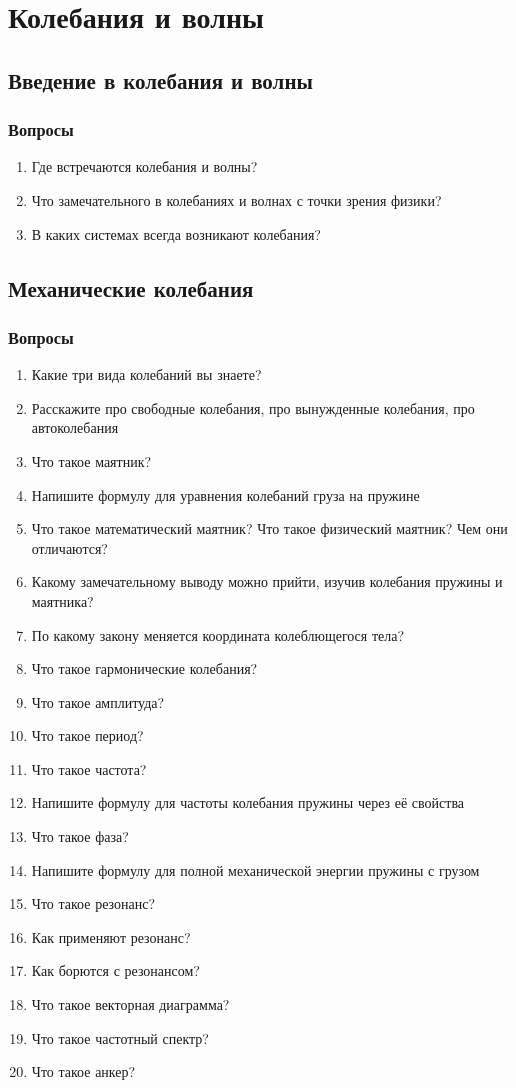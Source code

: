 \documentclass[12pt,a4paper]{report}
\begin{document}
\part{Колебания и волны}
\setcounter{chapter}{-1}

\chapter{Введение в колебания и волны}
\section{Вопросы}
\begin{enumerate}
\item Где встречаются колебания и волны?
\item Что замечательного в колебаниях и волнах с точки зрения физики?
\item В каких системах всегда возникают колебания?
\end{enumerate}

\chapter{Механические колебания}
\section{Вопросы}
\begin{enumerate}
\item Какие три вида колебаний вы знаете?
\item Расскажите про свободные колебания, про вынужденные колебания, про автоколебания
\item Что такое маятник?
\item Напишите формулу для уравнения колебаний груза на пружине
\item Что такое математический маятник? Что такое физический маятник? Чем они отличаются?
\item Какому замечательному выводу можно прийти, изучив колебания пружины и маятника?
\item По какому закону меняется координата колеблющегося тела?
\item Что такое гармонические колебания?
\item Что такое амплитуда?
\item Что такое период?
\item Что такое частота?
\item Напишите формулу для частоты колебания пружины через её свойства
\item Что такое фаза?
\item Напишите формулу для полной механической энергии пружины с грузом
\item Что такое резонанс?
\item Как применяют резонанс?
\item Как борются с резонансом?
\item Что такое векторная диаграмма?
\item Что такое частотный спектр?
\item Что такое анкер?
\end{enumerate}
\end{document}
